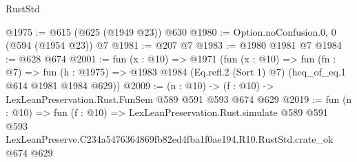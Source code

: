 \begin{lexlean}{RustStd}
\begin{coremodule}
@1975 := @615 (@625 (@1949 @23)) @630
@1980 := Option.noConfusion.{0, 0} (@594 (@1954 @23)) @7
@1981 := @207 @7
@1983 := @1980 @1981 @7
@1984 := @628 @674
@2001 := fun (x : @10) =>
  @1971
    (fun (x : @10) =>
    fun (fn : @7) =>
    fun (h : @1975) => @1983 @1984 (Eq.refl.{2} (Sort 1) @7) (heq_of_eq.{1} @614 @1981 @1984 @629))
@2009 := (n : @10) -> (f : @10) -> LexLeanPreservation.Rust.FunSem @589 @591 @593 @674 @629
@2019 := fun (n : @10) =>
  fun (f : @10) =>
  LexLeanPreservation.Rust.simulate
    @589
    @591
    @593
    LexLeanPreserve.C234a5476364869fb82ed4fba1f0ae194.R10.RustStd.crate_ok
    @674
    @629
\end{coremodule}
\end{lexlean}

